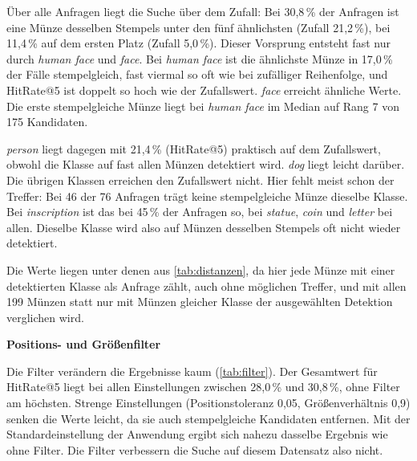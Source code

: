 \noindent Über alle Anfragen liegt die Suche über dem Zufall: Bei 30,8\,\% der Anfragen ist eine Münze desselben Stempels unter den fünf ähnlichsten (Zufall 21,2\,\%), bei 11,4\,\% auf dem ersten Platz (Zufall 5,0\,\%). Dieser Vorsprung entsteht fast nur durch \textit{human face} und \textit{face}. Bei \textit{human face} ist die ähnlichste Münze in 17,0\,\% der Fälle stempelgleich, fast viermal so oft wie bei zufälliger Reihenfolge, und HitRate@5 ist doppelt so hoch wie der Zufallswert. \textit{face} erreicht ähnliche Werte. Die erste stempelgleiche Münze liegt bei \textit{human face} im Median auf Rang 7 von 175 Kandidaten.
 
\textit{person} liegt dagegen mit 21,4\,\% (HitRate@5) praktisch auf dem Zufallswert, obwohl die Klasse auf fast allen Münzen detektiert wird. \textit{dog} liegt leicht darüber. Die übrigen Klassen erreichen den Zufallswert nicht. Hier fehlt meist schon der Treffer: Bei 46 der 76 Anfragen trägt keine stempelgleiche Münze dieselbe Klasse. Bei \textit{inscription} ist das bei 45\,\% der Anfragen so, bei \textit{statue}, \textit{coin} und \textit{letter} bei allen. Dieselbe Klasse wird also auf Münzen desselben Stempels oft nicht wieder detektiert.
 
Die Werte liegen unter denen aus \cref{tab:distanzen}, da hier jede Münze mit einer detektierten Klasse als Anfrage zählt, auch ohne möglichen Treffer, und mit allen 199 Münzen statt nur mit Münzen gleicher Klasse der ausgewählten Detektion verglichen wird.
 
\vspace{\baselineskip}
 
\noindent \textbf{Positions- und Größenfilter}
 
\noindent Die Filter verändern die Ergebnisse kaum (\cref{tab:filter}). Der Gesamtwert für HitRate@5 liegt bei allen Einstellungen zwischen 28,0\,\% und 30,8\,\%, ohne Filter am höchsten. Strenge Einstellungen (Positionstoleranz 0,05, Größenverhältnis 0,9) senken die Werte leicht, da sie auch stempelgleiche Kandidaten entfernen. Mit der Standardeinstellung der Anwendung ergibt sich nahezu dasselbe Ergebnis wie ohne Filter. Die Filter verbessern die Suche auf diesem Datensatz also nicht.
 
